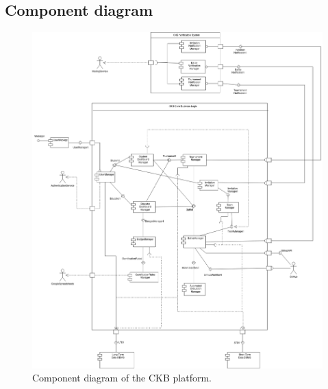 \subsection{Component diagram}
\label{subsec:component_diagram}%
\begin{figure} [H]
    \begin{center}
        \includegraphics[width=1\linewidth]{Images/compdiag.png}
        \caption{Component diagram of the CKB platform.}
        \label{fig: cd}
    \end{center}
\end{figure}

\newpage

